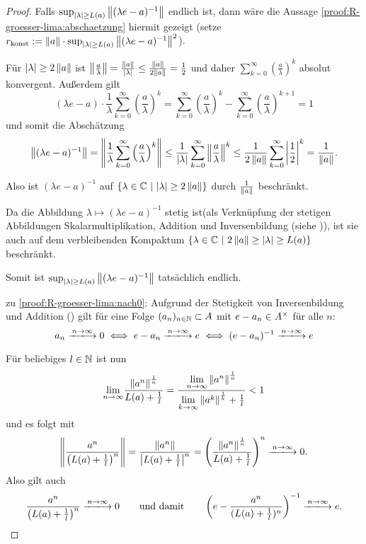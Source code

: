 \begin{proof}
Falls $\sup_{|\lambda| \geq L(a)}\left\lVert(\lambda e - a)^{-1}\right\rVert$ endlich ist, dann wäre die Aussage \ref{proof:R-groesser-lima:abschaetzung} hiermit gezeigt (setze $r_\textup{konst} := \left\lVert a\right\rVert \cdot \sup_{|\lambda| \geq L(a)}\left\lVert(\lambda e - a)^{-1}\right\rVert^2$).

Für $|\lambda| \geq 2\left\lVert a\right\rVert$ ist $\left\lVert\frac{a}{\lambda}\right\rVert = \frac{\left\lVert a\right\rVert}{|\lambda|} \leq \frac{\left\lVert a\right\rVert}{2\left\lVert a\right\rVert} = \frac{1}{2}$ und daher $\sum_{k=0}^\infty \left(\frac{a}{\lambda}\right)^k$ absolut konvergent. Außerdem gilt
	\[(\lambda e - a)\cdot \frac{1}{\lambda}\sum_{k=0}^\infty \left(\frac{a}{\lambda}\right)^k = \sum_{k=0}^\infty \left(\frac{a}{\lambda}\right)^k - \sum_{k=0}^\infty \left(\frac{a}{\lambda}\right)^{k+1} = 1\]
und somit die Abschätzung
	\[\left\lVert(\lambda e - a)^{-1}\right\rVert = \left\lVert\frac{1}{\lambda}\sum_{k=0}^\infty \left(\frac{a}{\lambda}\right)^k\right\rVert \leq \frac{1}{|\lambda|}\sum_{k=0}^\infty\left\lVert\frac{a}{\lambda}\right\rVert^k \leq \frac{1}{2\left\lVert a\right\rVert}\sum_{k=0}^\infty\left|\frac{1}{2}\right|^k = \frac{1}{\left\lVert a\right\rVert}. \]

Also ist $(\lambda e - a)^{-1}$ auf $\{\lambda \in \mathbb{C} ~|~ |\lambda| \geq 2\left\lVert a\right\rVert\}$ durch $\frac{1}{\left\lVert a\right\rVert}$ beschränkt.

Da die Abbildung $\lambda \mapsto (\lambda e - a)^{-1}$ stetig ist(als Verknüpfung der stetigen Abbildungen Skalarmultiplikation, Addition und Inversenbildung (siehe )), ist sie auch auf dem verbleibenden Kompaktum $\{\lambda \in \mathbb{C} ~|~ 2\left\lVert a\right\rVert \geq |\lambda| \geq L(a)\}$ beschränkt. 

Somit ist $\sup_{|\lambda| \geq L(a)}\left\lVert(\lambda e - a)^{-1}\right\rVert$ tatsächlich endlich.


zu \ref{proof:R-groesser-lima:nach0}:
Aufgrund der Stetigkeit von Inversenbildung und Addition () gilt für eine Folge $(a_n)_{n\in\mathbb{N}} \subset A$ mit $e - a_n \in A^\times$ für alle $n$:
	\[a_n \xlongrightarrow{n\to\infty} 0 \iff e - a_n  \xlongrightarrow{n\to\infty} e \iff (e-a_n)^{-1} \xlongrightarrow{n\to\infty} e\]

Für beliebiges $l \in \mathbb{N}$ ist nun 
	\[\underset{n\to \infty}{\lim}\frac{\left\lVert a^n\right\rVert^\frac{1}{n}}{L(a)+\frac{1}{l}} = \frac{\underset{n\to \infty}{\lim}\left\lVert a^n\right\rVert^\frac{1}{n}}{\underset{k\to\infty}{\lim}\left\lVert a^k\right\rVert^\frac{1}{k}+\frac{1}{l}} < 1\]
und es folgt mit 
	\[\norm{\frac{a^n}{\left(\lima+\frac{1}{l}\right)^n}} = \frac{\norm{a^n}}{\left|\lima+\frac{1}{l}\right|^n} = \left(\frac{\norm{a^n}^\frac{1}{n}}{\lima+\frac{1}{l}}\right)^n \xlongrightarrow{n\to\infty} 0.\]
Also gilt auch
	\[\frac{a^n}{\left(\lima+\frac{1}{l}\right)^n} \xlongrightarrow{n\to\infty} 0 \qquad \text{und damit} \qquad \left(e - \frac{a^n}{(\lima+\frac{1}{l})^n}\right)^{-1} \xlongrightarrow{n\to\infty} e.\]


\end{proof}
